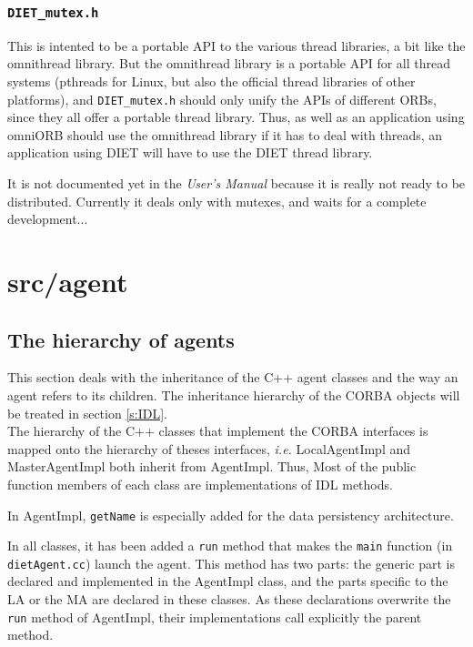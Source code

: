   \subsubsection{\tt DIET\_mutex.h}

  This is intented to be a portable API to the various thread libraries, a bit
  like the \textsf{omnithread} library. But the \textsf{omnithread} library is a
  portable API for all thread systems (pthreads for Linux, but also the official
      thread libraries of other platforms), and {\tt DIET\_mutex.h} should only unify
  the APIs of different ORBs, since they all offer a portable thread library.
  Thus, as well as an application using \textsf{omniORB} should use the
  \textsf{omnithread} library if it has to deal with threads, an application using
  DIET will have to use the DIET thread library.

  It is not documented yet in the \textit{User's Manual} because it is really not
  ready to be distributed. Currently it deals only with mutexes, and waits for a
  complete development...



  \section{\textsf{src/agent}}
  \label{s:agent}

  \subsection{The hierarchy of agents}

  This section deals with the inheritance of the C++ agent classes and the way an
  agent refers to its children. The inheritance hierarchy of the CORBA objects
  will be treated in section \ref{s:IDL}.
  \\

  The hierarchy of the C++ classes that implement the CORBA interfaces is mapped
  onto the hierarchy of theses interfaces, \emph{i.e.} \textsf{LocalAgentImpl} and
  \textsf{MasterAgentImpl} both inherit from \textsf{AgentImpl}. Thus, Most of the
  public function members of each class are implementations of IDL methods.

  In \textsf{AgentImpl}, \texttt{getName} is especially added for the data
  persistency architecture.

  In all classes, it has been added a \texttt{run} method that makes the
  \texttt{main} function (in \texttt{dietAgent.cc}) launch the agent. This method
  has two parts: the generic part is declared and implemented in the
  \textsf{AgentImpl} class, and the parts specific to the LA or the MA are
  declared in these classes. As these declarations overwrite the \texttt{run}
  method of \textsf{AgentImpl}, their implementations call explicitly the parent
  method.


